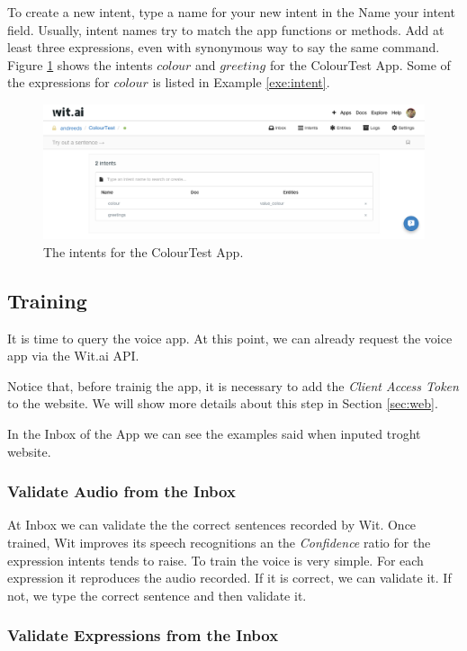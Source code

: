 \documentclass[twoside,11pt]{article}
\begin{document}
To create a new intent, type a name for your new intent in the Name your intent field.
Usually, intent names try to match the app functions or methods. 
Add at least three expressions, even with synonymous way to say the same command.
Figure \ref{fig:entents} shows the intents $colour$ and $greeting$ for the ColourTest App.
Some of the expressions for $colour$ is listed in Example \ref{exe:intent}.


\begin{figure}[!h]
    \includegraphics[width=\textwidth]{figures/entities.png}
    \caption{The intents for the ColourTest App.}
    \label{fig:entents}
\end{figure}


\subsection{Training}

It is time to query the voice app.
At this point, we can already request the voice app via the Wit.ai API.

Notice that, before trainig the app, it is necessary to add the \emph{Client Access Token} to the website.
We will show more details about this step in Section \ref{sec:web}.

In the Inbox of the App we can see the examples said when inputed troght website.

\subsubsection{Validate Audio from the Inbox}

At Inbox we can validate the the correct sentences recorded by Wit.
Once trained, Wit improves its speech recognitions an the \emph{Confidence} ratio for the expression intents tends to raise.
To train the voice is very simple.
For each expression it reproduces the audio recorded.
If it is correct, we can validate it.
If not, we type the correct sentence and then validate it.

\subsubsection{Validate Expressions from the Inbox}
\end{document}
